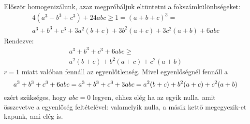    Először homogenizálunk, azaz megpróbáljuk eltüntetni a fokszámkülönbségeket:
   \begin{align*}
   4(a^{3}+b^{3}+c^{3})+24abc \ge 1=(a+b+c)^{3} = \\
   a^{3}+b^{3}+c^{3} + 3a^{2}(b+c)+3b^{2}(a+c)+3c^{2}(a+b)+6abc 
   \end{align*}
   Rendezve:
   \begin{align*}
   a^{3}+b^{3}+c^{3}+6abc \ge \\
   a^{2}(b+c)+b^{2}(a+c)+c^{2}(a+b)
   \end{align*}
    $r=1$ miatt valóban fennáll az egyenlőtlenség.
   Mivel egyenlőségnél fennáll a 
   $$
   a^{3}+b^{3}+c^{3}+6abc = a^{3}+b^{3}+c^{3}+3abc = \\
   a^{2}(b+c)+b^{2}(a+c)+c^{2}(a+b)
   $$
   ezért szükséges, hogy $abc=0$ legyen, ehhez elég ha az egyik nulla, 
   amit összevetve a  egyenlőség feltételével: 
   valamelyik nulla, a másik kettő megegyezik-et kapunk, ami elég is.

